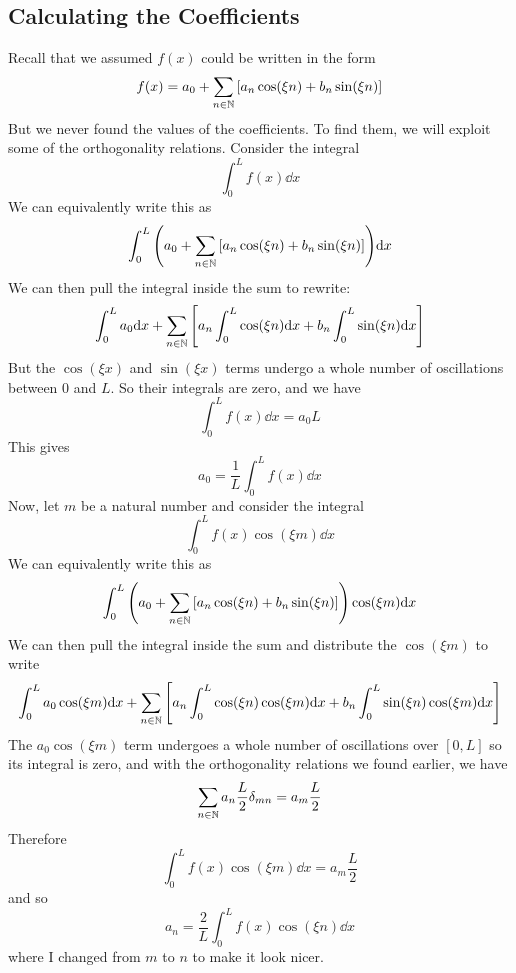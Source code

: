 \subsection*{Calculating the Coefficients}
Recall that we assumed $f(x)$ could be written in the form
\[ f(x) = a_0 + \sum_{n\in\N} \bqty{a_n\cos(\xi n) + b_n\sin(\xi n)} \]
But we never found the values of the coefficients. To find them, we will exploit some of the orthogonality relations. Consider the integral
\[ \int_0^L f(x) \dd x \]
We can equivalently write this as
\begin{align*}
    \int_0^L \pqty{a_0 + \sum_{n\in\N} \bqty{a_n\cos(\xi n) + b_n\sin(\xi n)}}\dd x
\end{align*}
We can then pull the integral inside the sum to rewrite:
\[ \int_0^L a_0\dd x + \sum_{n\in \N} \bqty{a_n\int_0^L \cos(\xi n)\dd x + b_n\int_0^L \sin(\xi n)\dd x}\]
But the $\cos(\xi x)$ and $\sin(\xi x)$ terms undergo a whole number of oscillations between $0$ and $L$. So their integrals are zero, and we have
\[ \int_0^L f(x)\dd x = a_0 L\]
This gives
\[ a_0 = \frac{1}{L}\int_0^L f(x)\dd x\]
Now, let $m$ be a natural number and consider the integral
\[ \int_0^L f(x) \cos(\xi m)\dd x\]
We can equivalently write this as 
\begin{align*}
    \int_0^L \pqty{a_0 + \sum_{n\in\N} \bqty{a_n\cos(\xi n) + b_n\sin(\xi n)}}\cos(\xi m)\dd x
\end{align*}
We can then pull the integral inside the sum and distribute the $\cos(\xi m)$ to write
\[ \int_0^L a_0\cos(\xi m)\dd x + \sum_{n\in\N} \bqty{a_n \int_0^L \cos(\xi n)\cos(\xi m)\dd x + b_n\int_0^L \sin(\xi n)\cos(\xi m)\dd x}\]
The $a_0\cos(\xi m)$ term undergoes a whole number of oscillations over $[0,L]$ so its integral is zero, and with the orthogonality relations we found earlier, we have
\[ \sum_{n\in \mathbb{N}} a_n\frac{L}{2}\delta_{mn} = a_m\frac{L}{2} \]
Therefore
\[ \int_0^L f(x)\cos(\xi m)\dd x = a_m\frac{L}{2} \]
and so
\[ a_n = \frac{2}{L}\int_0^L f(x)\cos(\xi n)\dd x\]
where I changed from $m$ to $n$ to make it look nicer. 


